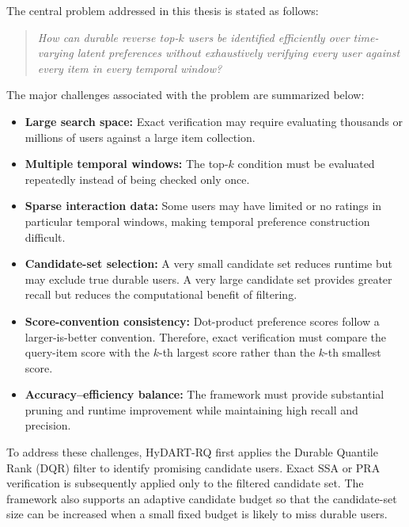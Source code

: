 The central problem addressed in this thesis is stated as follows:

\begin{quote}
\textit{How can durable reverse top-$k$ users be identified efficiently over time-varying latent preferences without exhaustively verifying every user against every item in every temporal window?}
\end{quote}

The major challenges associated with the problem are summarized below:

\begin{itemize}

\item \textbf{Large search space:}
Exact verification may require evaluating thousands or millions of users against a large item collection.

\item \textbf{Multiple temporal windows:}
The top-$k$ condition must be evaluated repeatedly instead of being checked only once.

\item \textbf{Sparse interaction data:}
Some users may have limited or no ratings in particular temporal windows, making temporal preference construction difficult.

\item \textbf{Candidate-set selection:}
A very small candidate set reduces runtime but may exclude true durable users. A very large candidate set provides greater recall but reduces the computational benefit of filtering.

\item \textbf{Score-convention consistency:}
Dot-product preference scores follow a larger-is-better convention. Therefore, exact verification must compare the query-item score with the $k$-th largest score rather than the $k$-th smallest score.

\item \textbf{Accuracy--efficiency balance:}
The framework must provide substantial pruning and runtime improvement while maintaining high recall and precision.

\end{itemize}

To address these challenges, HyDART-RQ first applies the Durable Quantile Rank (DQR) filter to identify promising candidate users. Exact SSA or PRA verification is subsequently applied only to the filtered candidate set. The framework also supports an adaptive candidate budget so that the candidate-set size can be increased when a small fixed budget is likely to miss durable users.

